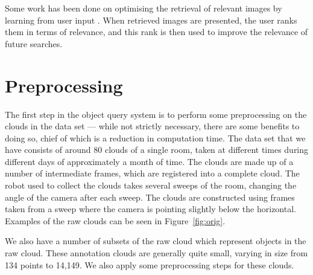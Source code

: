 \documentclass[11pt,a4paper]{kth-mag}
\begin{document}
Some work has been done on optimising the retrieval of relevant images by
learning from user input \cite{rui2000optimizing}. When retrieved images are
presented, the user ranks them in terms of relevance, and this rank is then used
to improve the relevance of future searches.

\chapter{Preprocessing}
\label{chap:preprocess}
The first step in the object query system is to perform some preprocessing on
the clouds in the data set --- while not strictly necessary, there are some
benefits to doing so, chief of which is a reduction in computation time. The
data set that we have consists of around 80 clouds of a single room, taken at
different times during different days of approximately a month of time. The
clouds are made up of a number of intermediate frames, which are registered into
a complete cloud. The robot used to collect the clouds takes several sweeps of
the room, changing the angle of the camera after each sweep. The clouds are
constructed using frames taken from a sweep where the camera is pointing
slightly below the horizontal. Examples of the raw clouds can be seen in
Figure~\ref{fig:orig}.

We also have a number of subsets of the raw cloud which represent objects in the
raw cloud. These annotation clouds are generally quite small, varying in size
from 134 points to 14,149. We also apply some preprocessing steps for these
clouds.
\end{document}
